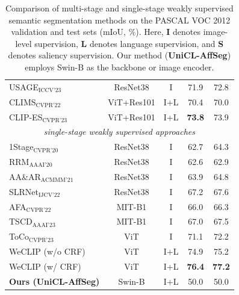\begin{table}[!t]
\begin{tabular}{l c c c c}
        USAGE$_{\text{ICCV'23}}$~\cite{wsss_usage}    & ResNet38   & I    & 71.9          & 72.8          \\
        CLIMS$_{\text{CVPR'22}}$~\cite{wsss_clims}    & ViT+Res101 & I+L  & 70.4          & 70.0          \\
        CLIP-ES$_{\text{CVPR'23}}$~\cite{wsss_clip_es}                       & ViT+Res101 & I+L  & \textbf{73.8} & 73.9          \\
        \hline
        \multicolumn{5}{c}{\textit{single-stage weakly supervised approaches}}                                                   \\
        1Stage$_{\text{CVPR'20}}$~\cite{wsss_single_stage}                   & ResNet38   & I    & 62.7          & 64.3          \\
        RRM$_{\text{AAAI'20}}$~\cite{wsss_reliability_does_matter}           & ResNet38   & I    & 62.6          & 62.9          \\
        AA\&AR$_{\text{ACMMM'21}}$~\cite{wsss_aaar}                                 & ResNet38   & I    & 63.9          & 64.8          \\
        SLRNet$_{\text{IJCV'22}}$~\cite{wsss_slr_net}                                  & ResNet38   & I    & 67.2          & 67.6          \\
        AFA$_{\text{CVPR'22}}$~\cite{wsss_afa_affinity_from_attention}                                     & MIT-B1     & I    & 66.0          & 66.3          \\
        TSCD$_{\text{AAAI'23}}$~\cite{wsss_tscd}                                    & MIT-B1     & I    & 67.0          & 67.5          \\
        ToCo$_{\text{CVPR'23}}$~\cite{wsss_toco_token_contrast}                                    & ViT        & I    & 71.1          & 72.2          \\
        WeCLIP (w/o CRF)                                                & ViT        & I+L  & 74.9          & 75.2          \\
        WeCLIP (w/ CRF)                                                 & ViT        & I+L  & \textbf{76.4} & \textbf{77.2} \\
        \hline
        \textbf{Ours (UniCL-AffSeg)} & Swin-B & I+L & 50.0 & 50.0 \\
        \hline
    \end{tabular}
    \caption{
    Comparison of multi-stage and single-stage weakly supervised semantic segmentation methods on the PASCAL VOC 2012 validation and test sets (mIoU, \%). 
    Here, \textbf{I} denotes image-level supervision, \textbf{L} denotes language supervision, and \textbf{S} denotes saliency supervision. 
    Our method (\textbf{UniCL-AffSeg}) employs Swin-B as the backbone or image encoder.
    }
    \label{tab:quantitative_results}
\end{table}

